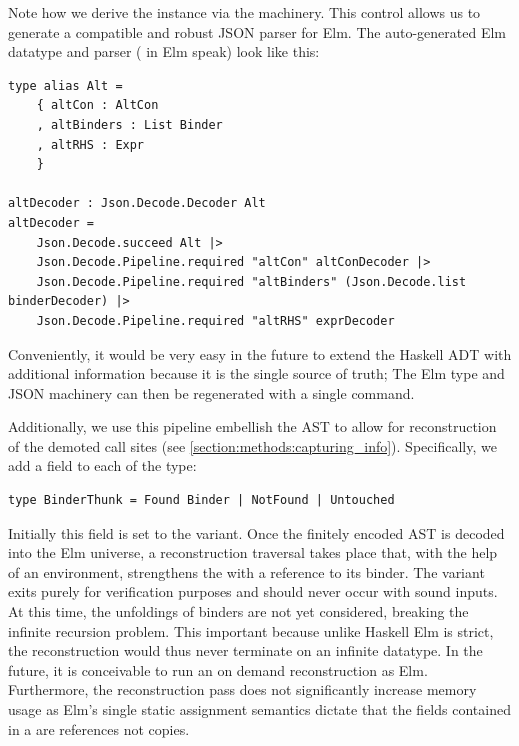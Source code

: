 Note how we derive the  instance via the  machinery. This control allows
us to generate a compatible and robust JSON parser for Elm. The auto-generated Elm datatype and parser
( in Elm speak) look like this:

\begin{listing}[H]
\begin{verbatim}
type alias Alt =
    { altCon : AltCon
    , altBinders : List Binder
    , altRHS : Expr
    }

altDecoder : Json.Decode.Decoder Alt
altDecoder =
    Json.Decode.succeed Alt |>
    Json.Decode.Pipeline.required "altCon" altConDecoder |>
    Json.Decode.Pipeline.required "altBinders" (Json.Decode.list binderDecoder) |>
    Json.Decode.Pipeline.required "altRHS" exprDecoder
\end{verbatim}
\end{listing}

Conveniently, it would be very easy in the future to extend the Haskell ADT with additional information
because it is the single source of truth; The Elm type and JSON machinery can then be regenerated with a single command.

Additionally, we use this pipeline embellish the AST to allow for reconstruction of the demoted call sites (see \cref{section:methods:capturing_info}).
Specifically, we add a field to each  of the type:

\begin{listing}[H]
\begin{verbatim}
type BinderThunk = Found Binder | NotFound | Untouched
\end{verbatim}
\end{listing}

Initially this field is set to the  variant. Once the finitely encoded AST is decoded into the 
Elm universe, a reconstruction traversal takes place that, with the help of an environment, strengthens the 
 with a reference to its binder. The  variant exits purely for verification purposes
and should never occur with sound inputs. At this time, the unfoldings of binders are not yet considered, breaking the 
infinite recursion problem. This important because unlike Haskell Elm is strict, the reconstruction would thus never
terminate on an infinite datatype. In the future, it is conceivable to run an on demand reconstruction as Elm. Furthermore,
the reconstruction pass does not significantly increase memory usage as Elm's single static assignment semantics dictate that
the fields contained in a  are references not copies.

